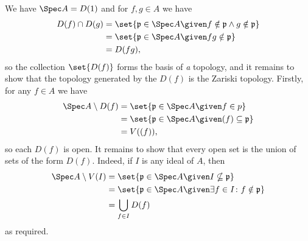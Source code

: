 We have $\Spec A = D(1)$ and for  $f, g \in A$ we have
\begin{align*}
	D(f)\cap D(g) &= \set{\mathfrak{p} \in \Spec A\given f\notin \mathfrak{p} \wedge g\notin \mathfrak{p}}\\
	&= \set{\mathfrak{p} \in \Spec A\given fg\notin \mathfrak{p}}\\
	&= D(fg),
\end{align*}
so the collection $\set{D(f)}$ forms the basis of \emph{a} topology, and it remains
to show that the topology generated by the $D(f)$ is the Zariski topology. Firstly,
for any $f \in A$ we have
\begin{align*}
	\Spec A\setminus D(f) &= \set{\mathfrak{p} \in \Spec A\given f \in p}\\
	&= \set{\mathfrak{p} \in \Spec A\given (f) \subseteq \mathfrak{p}}\\
	&= V((f)),
\end{align*}
so each $D(f)$ is open. It remains to show that every open set is the union
of sets of the form $D(f)$. Indeed, if $I$ is any ideal of $A$, then
\begin{align*}
	\Spec A\setminus V(I) &= \set{\mathfrak{p} \in \Spec A\given I\nsubseteq \mathfrak{p}}\\
	&= \set{\mathfrak{p} \in \Spec A\given \exists f\in I\colon f\notin \mathfrak{p}}\\
	&=\bigcup_{f \in I}D(f)
\end{align*}
as required.
